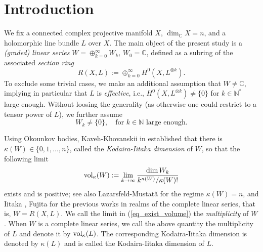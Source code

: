 \documentclass[12pt]{article}
\numberwithin{equation}{section}
\theoremstyle{theorem}
\theoremstyle{definition}
\theoremstyle{remark}
\newcommand{\comp}{\mathbb{C}}
\newcommand{\nat}{\mathbb{N}}
\begin{document}
\vspace*{-1.5cm}

\tableofcontents

\vspace*{-0.2cm}

\noindent \hrulefill



\section{Introduction}\label{sect_intro}
	We fix a connected complex projective manifold $X$, $\dim_{\comp} X = n$, and a holomorphic line bundle $L$ over $X$.
	The main object of the present study is a \textit{(graded) linear series} $W = \oplus_{k = 0}^{\infty} W_k$, $W_0 = \comp$, defined as a subring of the associated \textit{section ring}
	\begin{equation}
		R(X, L) := \oplus_{k = 0}^{\infty} H^0(X, L^{\otimes k}).
	\end{equation}
	To exclude some trivial cases, we make an additional assumption that $W \neq \comp$, implying in particular that $L$ is \textit{effective}, i.e., $H^0(X, L^{\otimes k}) \neq \{0\}$ for $k \in \nat^*$ large enough.
	Without loosing the generality (as otherwise one could restrict to a tensor power of $L$), we further assume
	\begin{equation}\label{eq_lin_series_ndg}
		W_k \neq \{ 0 \}, \quad \text{for } k \in \nat \text{ large enough}.
	\end{equation}
	\par 
	Using Okounkov bodies, Kaveh-Khovanskii in \cite[Theorem 3.4]{KavehKhov} established that there is $\kappa(W) \in \{0, 1, \ldots, n\}$, called the \textit{Kodaira-Iitaka dimension} of $W$, so that the following limit
	\begin{equation}\label{eq_exist_volume}
		{\rm{vol}}_{\kappa}(W)
		:=
		\lim_{k \to \infty} \frac{\dim W_k}{k^{\kappa(W)} / \kappa(W)!}
	\end{equation}
	exists and is positive; see also Lazarsfeld-Mustață \cite{LazMus} for the regime $\kappa(W) = n$, and Iitaka \cite{Iitaka}, Fujita \cite{Fujita} for the previous works in realms of the complete linear series, that is, $W = R(X,L)$.
	We call the limit in (\ref{eq_exist_volume}) the \textit{multiplicity} of $W$.
	When $W$ is a complete linear series, we call the above quantity the multiplicity of $L$ and denote it by ${\rm{vol}}_{\kappa}(L)$. 
	The corresponding Kodaira-Iitaka dimension is denoted by $\kappa(L)$ and is called the Kodaira-Iitaka dimension of $L$.
\end{document}
